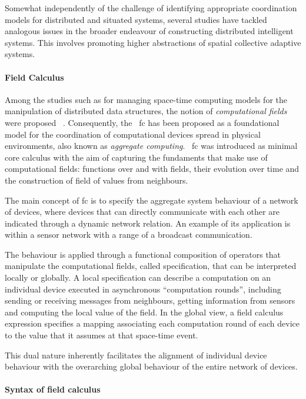 Somewhat independently of the challenge of identifying appropriate coordination models for distributed and situated systems,
several studies have tackled analogous issues in the broader endeavour of constructing distributed intelligent systems.
This involves promoting higher abstractions of spatial collective adaptive systems.

\paragraph{Field Calculus}
Among the studies such as for managing space-time computing models for the manipulation of distributed data structures,
the notion of \emph{computational fields} were proposed ~\cite{VIROLI2019100486}.
Consequently, the ~\ac{fc} has been proposed as a foundational model for the coordination of computational
devices spread in physical environments, also known as \emph{aggregate computing}.
~\ac{fc} was introduced as minimal core calculus with the aim of capturing the fundaments that make use of computational
fields: functions over and with fields, their evolution over time and the construction of field of values from neighbours.

The main concept of \ac{fc} is to specify the aggregate system behaviour of a network of devices, where devices that can
directly communicate with each other are indicated through a dynamic network relation.
An example of its application is within a sensor network with a range of a broadcast communication.

The behaviour is applied through a functional composition of operators that manipulate the computational fields,
called specification, that can be interpreted locally or globally.
A local specification can describe a computation on an individual device executed in asynchronous ``computation rounds'',
including sending or receiving messages from neighbours, getting information from sensors and computing the local value of the field.
In the global view, a field calculus expression specifies a mapping associating each computation round of each device to
the value that it assumes at that space-time event.

This dual nature inherently facilitates the alignment of individual device behaviour with the overarching global behaviour
of the entire network of devices.

\paragraph{Syntax of field calculus}
\label{par:syntax-of-field-calculus}

